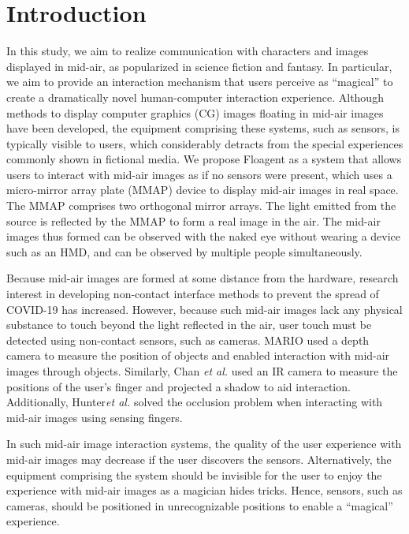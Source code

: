 \documentclass[sigconf]{acmart}
\begin{document}
\maketitle

\section{Introduction \label{intro}}

In this study, we aim to realize communication with characters and images displayed in mid-air, as popularized in science fiction and fantasy.
In particular, we aim to provide an interaction mechanism that users perceive as ``magical'' to create a dramatically novel human-computer interaction experience.
Although methods to display computer graphics (CG) images floating in mid-air images have been developed, the equipment comprising these systems, such as sensors, is typically visible to users, which considerably detracts from the special experiences commonly shown in fictional media.
We propose Floagent as a system that allows users to interact with mid-air images as if no sensors were present, which uses a micro-mirror array plate (MMAP) device to display mid-air images in real space.
The MMAP comprises two orthogonal mirror arrays. The light emitted from the source is reflected by the MMAP to form a real image in the air.
The mid-air images thus formed can be observed with the naked eye without wearing a device such as an HMD, and can be observed by multiple people simultaneously.

Because mid-air images are formed at some distance from the hardware, research interest in developing non-contact interface methods to prevent the spread of COVID-19 has increased.
However, because such mid-air images lack any physical substance to touch beyond the light reflected in the air, user touch must be detected using non-contact sensors, such as cameras.
MARIO\cite{MARIO} used a depth camera to measure the position of objects and enabled interaction with mid-air images through objects.
Similarly, Chan \textit{et al.}\cite{Void} used an IR camera to measure the positions of the user's finger and projected a shadow to aid interaction.
Additionally, Hunter\textit{et al.}\cite{Seth} solved the occlusion problem when interacting with mid-air images using sensing fingers.

In such mid-air image interaction systems, the quality of the user experience with mid-air images may decrease if the user discovers the sensors.
Alternatively, the equipment comprising the system should be invisible for the user to enjoy the experience with mid-air images as a magician hides tricks.
Hence, sensors, such as cameras, should be positioned in unrecognizable positions to enable a ``magical'' experience.
\end{document}
